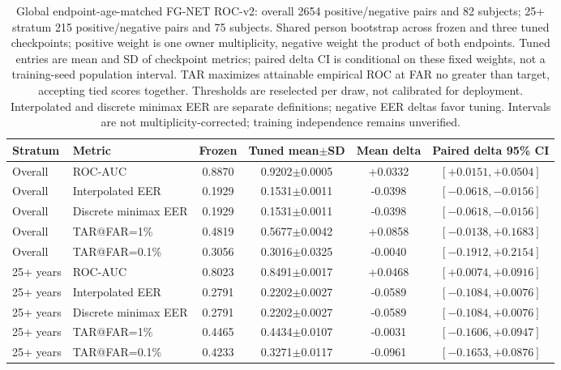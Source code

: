 \begin{table}[!t]
\caption{Global endpoint-age-matched FG-NET ROC-v2: overall 2654 positive/negative pairs and 82 subjects; 25+ stratum 215 positive/negative pairs and 75 subjects. Shared person bootstrap across frozen and three tuned checkpoints; positive weight is one owner multiplicity, negative weight the product of both endpoints. Tuned entries are mean and SD of checkpoint metrics; paired delta CI is conditional on these fixed weights, not a training-seed population interval. TAR maximizes attainable empirical ROC at FAR no greater than target, accepting tied scores together. Thresholds are reselected per draw, not calibrated for deployment. Interpolated and discrete minimax EER are separate definitions; negative EER deltas favor tuning. Intervals are not multiplicity-corrected; training independence remains unverified.}
\label{tab:fgnet-roc-v2}
\centering\footnotesize
\begin{tabular}{@{}llcccc@{}}
\toprule
Stratum & Metric & Frozen & Tuned mean$\pm$SD & Mean delta & Paired delta 95\% CI \\
\midrule
Overall & ROC-AUC & 0.8870 & 0.9202$\pm$0.0005 & +0.0332 & $[+0.0151,+0.0504]$ \\
Overall & Interpolated EER & 0.1929 & 0.1531$\pm$0.0011 & -0.0398 & $[-0.0618,-0.0156]$ \\
Overall & Discrete minimax EER & 0.1929 & 0.1531$\pm$0.0011 & -0.0398 & $[-0.0618,-0.0156]$ \\
Overall & TAR@FAR=1\% & 0.4819 & 0.5677$\pm$0.0042 & +0.0858 & $[-0.0138,+0.1683]$ \\
Overall & TAR@FAR=0.1\% & 0.3056 & 0.3016$\pm$0.0325 & -0.0040 & $[-0.1912,+0.2154]$ \\
25+ years & ROC-AUC & 0.8023 & 0.8491$\pm$0.0017 & +0.0468 & $[+0.0074,+0.0916]$ \\
25+ years & Interpolated EER & 0.2791 & 0.2202$\pm$0.0027 & -0.0589 & $[-0.1084,+0.0076]$ \\
25+ years & Discrete minimax EER & 0.2791 & 0.2202$\pm$0.0027 & -0.0589 & $[-0.1084,+0.0076]$ \\
25+ years & TAR@FAR=1\% & 0.4465 & 0.4434$\pm$0.0107 & -0.0031 & $[-0.1606,+0.0947]$ \\
25+ years & TAR@FAR=0.1\% & 0.4233 & 0.3271$\pm$0.0117 & -0.0961 & $[-0.1653,+0.0876]$ \\
\bottomrule
\end{tabular}
\end{table}
